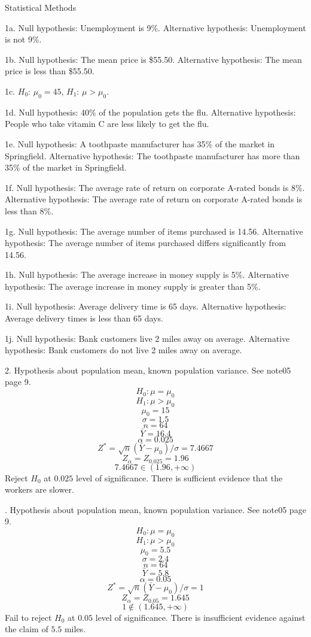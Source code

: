 \parindent=0pt

Statistical Methods

\bigskip
1a.
Null hypothesis: Unemployment is 9\%.
Alternative hypothesis: Unemployment is not 9\%.

\bigskip
1b.
Null hypothesis: The mean price is \$55{.}50.
Alternative hypothesis: The mean price is less than \$55{.}50.

\bigskip
1c. $H_0$: $\mu_0=45$, $H_1$: $\mu>\mu_0$.

\bigskip
1d.
Null hypothesis: 40\% of the population gets the flu.
Alternative hypothesis: People who take vitamin C are less likely to
get the flu.

\bigskip
1e.
Null hypothesis: A toothpaste manufacturer has 35\% of the
market in Springfield.
Alternative hypothesis:
The toothpaste manufacturer has more than 35\% of the market in
Springfield.

\bigskip
1f.
Null hypothesis:
The average rate of return on corporate A-rated bonds is 8\%.
Alternative hypothesis:
The average rate of return on corporate A-rated bonds is less than 8\%.

\bigskip
1g.
Null hypothesis:
The average number of items purchased is 14{.}56.
Alternative hypothesis:
The average number of items purchased differs significantly from 14{.}56.

\bigskip
1h.
Null hypothesis:
The average increase in money supply is 5\%.
Alternative hypothesis:
The average increase in money supply is greater than 5\%.

\bigskip
1i.
Null hypothesis:
Average delivery time is 65 days.
Alternative hypothesis:
Average delivery times is less than 65 days.

\bigskip
1j.
Null hypothesis:
Bank customers live 2 miles away on average.
Alternative hypothesis:
Bank customers do not live 2 miles away on average.

\vfill
\eject

2. Hypothesis about population mean, known population variance.
See note05 page 9.
$$H_0: \mu=\mu_0$$
$$H_1: \mu>\mu_0$$
$$\mu_0=15$$
$$\sigma=1.5$$
$$n=64$$
$$\bar Y=16.4$$
$$\alpha=0.025$$
$$Z^*=\sqrt n(\bar Y-\mu_0)/\sigma=7.4667$$
$$Z_\alpha=Z_{0.025}=1.96$$
$$7.4667\in(1.96,+\infty)$$
Reject $H_0$ at $0.025$ level of significance.
There is sufficient evidence that the workers are slower.

. Hypothesis about population mean, known population variance.
See note05 page 9.
$$H_0: \mu=\mu_0$$
$$H_1: \mu>\mu_0$$
$$\mu_0=5.5$$
$$\sigma=2.4$$
$$n=64$$
$$\bar Y=5.8$$
$$\alpha=0.05$$
$$Z^*=\sqrt n(\bar Y-\mu_0)/\sigma=1$$
$$Z_\alpha=Z_{0.05}=1.645$$
$$1\not\in(1.645,+\infty)$$
Fail to reject $H_0$ at $0.05$ level of significance.
There is insufficient evidence against the claim of $5.5$ miles.

